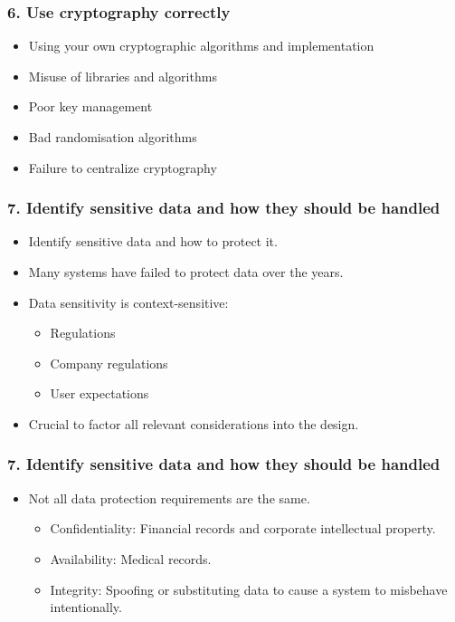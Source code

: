 \documentclass[12pt,norsk]{beamer}
\begin{document}
\begin{frame}

	\frametitle{6. Use cryptography correctly}
	
	\begin{itemize}
		
		\item Using your own cryptographic algorithms and implementation
		\item Misuse of libraries and algorithms
		\item Poor key management
		\item Bad randomisation algorithms
		\item Failure to centralize cryptography
	\end{itemize}
\end{frame}

\begin{frame}

	\frametitle{7. Identify sensitive data and how they should be handled}
	\begin{itemize}
		\item Identify sensitive data and how to protect it.
		\item Many systems have failed to protect data over the years.
		\item Data sensitivity is context-sensitive:
		\begin{itemize}
			\item Regulations
			\item Company regulations
			\item User expectations
		\end{itemize}
		\item Crucial to factor all relevant considerations into the design.
		
	\end{itemize}
	

\end{frame}

\begin{frame}

	\frametitle{7. Identify sensitive data and how they should be handled}
	\begin{itemize}

		\item Not all data protection requirements are the same.
		\begin{itemize}
			\item Confidentiality: Financial records and corporate intellectual property.
			\item Availability: Medical records.
			\item Integrity: Spoofing or substituting data to cause a system to misbehave intentionally.
		\end{itemize}
		
		
	\end{itemize}
	

\end{frame}
\end{document}
